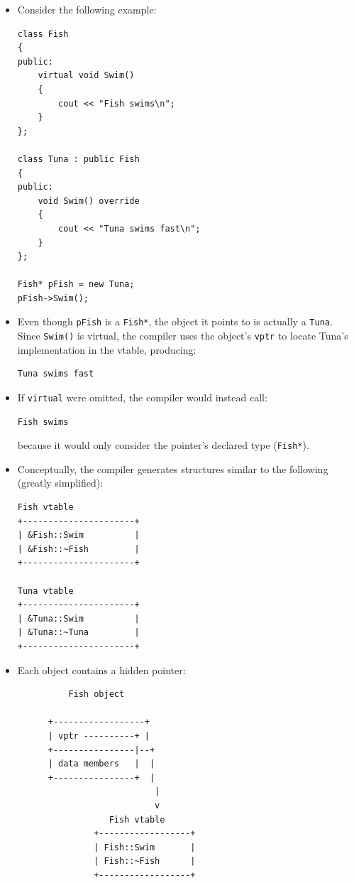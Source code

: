 \documentclass[10pt]{article}
\begin{document}
\begin{itemize}
	\item Consider the following example:

\begin{verbatim}
class Fish
{
public:
    virtual void Swim()
    {
        cout << "Fish swims\n";
    }
};

class Tuna : public Fish
{
public:
    void Swim() override
    {
        cout << "Tuna swims fast\n";
    }
};

Fish* pFish = new Tuna;
pFish->Swim();
\end{verbatim}

	\item Even though \texttt{pFish} is a \texttt{Fish*}, the object it points to is actually a \texttt{Tuna}. Since \texttt{Swim()} is virtual, the compiler uses the object's \texttt{vptr} to locate Tuna's implementation in the vtable, producing:

\begin{verbatim}
Tuna swims fast
\end{verbatim}

	\item If \texttt{virtual} were omitted, the compiler would instead call:

\begin{verbatim}
Fish swims
\end{verbatim}

	because it would only consider the pointer's declared type (\texttt{Fish*}).

	\item Conceptually, the compiler generates structures similar to the following (greatly simplified):

\begin{verbatim}
Fish vtable
+----------------------+
| &Fish::Swim          |
| &Fish::~Fish         |
+----------------------+

Tuna vtable
+----------------------+
| &Tuna::Swim          |
| &Tuna::~Tuna         |
+----------------------+
\end{verbatim}

	\item Each object contains a hidden pointer:

\begin{verbatim}
          Fish object

      +------------------+
      | vptr ----------+ |
      +----------------|--+
      | data members   |  |
      +----------------+  |
                           |
                           v
                  Fish vtable
               +------------------+
               | Fish::Swim       |
               | Fish::~Fish      |
               +------------------+
\end{verbatim}


\end{itemize}
\end{document}
